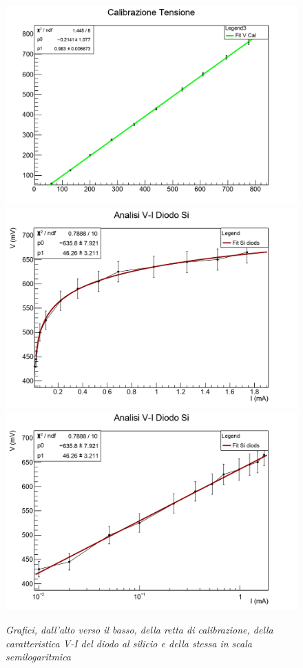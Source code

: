 \documentclass{article}
\begin{document}
\begin{figure}[H]
  \centering
  \includegraphics[scale=0.55]{Cal.jpg}
  \qquad
  \includegraphics[scale=0.55]{SiLog.jpg}
  \qquad
  \includegraphics[scale=0.55]{SiLin.jpg}
  \qquad
  \caption{\textit{Grafici, dall'alto verso il basso, della retta di calibrazione, della caratteristica V-I del diodo al silicio e della stessa in scala semilogaritmica}}
\end{figure}
\end{document}
